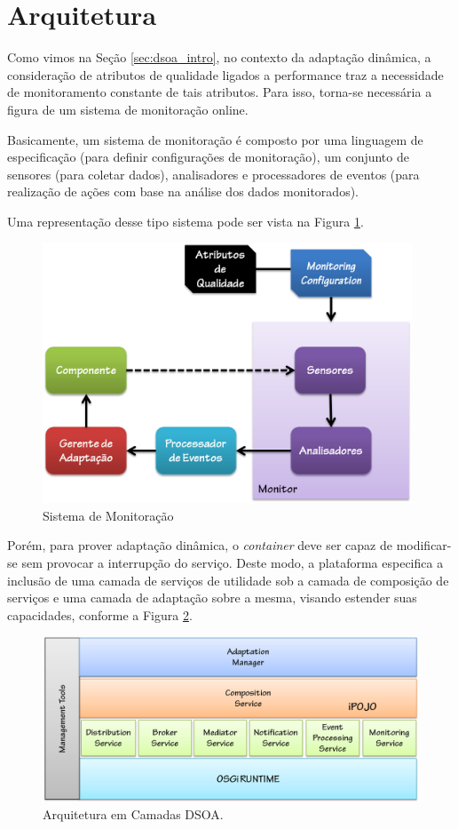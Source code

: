 \section{Arquitetura}
\label{sec:dsoa_arch}

Como vimos na Seção \ref{sec:dsoa_intro}, no contexto da adaptação dinâmica, a consideração de atributos de qualidade ligados a performance traz a necessidade de monitoramento constante de tais atributos. Para isso, torna-se necessária a figura de um sistema de monitoração online.

Basicamente, um sistema de monitoração é composto por uma linguagem de especificação (para definir configurações de monitoração), um conjunto de sensores (para coletar dados), analisadores e processadores de eventos (para realização de ações com base na análise dos dados monitorados). 

Uma representação desse tipo sistema pode ser vista na Figura \ref{fig:monitor}.


\begin{figure}[htp]
\centering
\includegraphics[width=11cm]{chapters/chapter3/monitor.png}
\caption{Sistema de Monitoração}
\label{fig:monitor}
\end{figure}

Porém, para prover adaptação dinâmica, o \textit{container} deve ser capaz de modificar-se sem provocar a interrupção do serviço. Deste modo, a plataforma especifica a inclusão de uma camada de serviços de utilidade sob a camada de composição de serviços e uma camada de adaptação sobre a mesma, visando estender suas capacidades, conforme a Figura \ref{fig:dsoa_arch}.

\begin{figure}[htp]
\centering
\includegraphics[width=13cm]{chapters/chapter3/dsoa-arch.png}
\caption[Arquitetura em Camadas DSOA]{Arquitetura em Camadas DSOA.}
\label{fig:dsoa_arch}
\end{figure}

